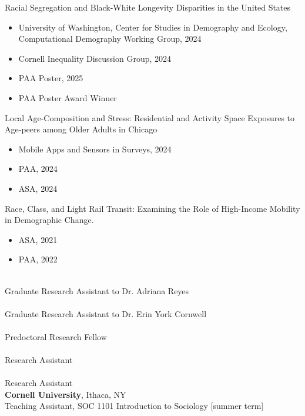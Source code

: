 \documentclass[11pt]{article} %
\begin{document}
Racial Segregation and Black-White Longevity Disparities in the United States 
\begin{itemize}
\item  University of Washington, Center for Studies in Demography and Ecology, Computational Demography Working Group, 2024
\item Cornell Inequality Discussion Group, 2024
\item PAA Poster, 2025
\item PAA Poster Award Winner
\end{itemize}
Local Age-Composition and Stress: Residential and Activity Space Exposures to Age-peers among Older Adults in Chicago
\begin{itemize}
\item Mobile Apps and Sensors in Surveys, 2024
\item PAA, 2024 
\item ASA, 2024
\end{itemize}
Race, Class, and Light Rail Transit: Examining the Role of High-Income Mobility in Demographic Change. 
\begin{itemize}
\item ASA, 2021
\item PAA, 2022
\end{itemize}
 \\ 
Graduate Research Assistant to Dr. Adriana Reyes \\
 \\ 
Graduate Research Assistant to Dr. Erin York Cornwell \\  
 \\ Predoctoral Research Fellow \\
 \\ Research Assistant \\ 
 \\ Research Assistant \\ 

\textbf{Cornell University}, Ithaca, NY \\
 Teaching Assistant, SOC 1101 Introduction to Sociology [summer term] \\
\end{document}
